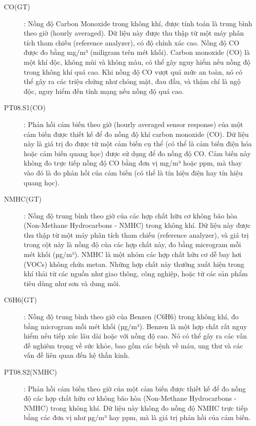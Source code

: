 \begin{description}
    \item[CO(GT)]: Nồng độ Carbon Monoxide trong không khí, được tính toán là trung bình theo giờ (hourly averaged). Dữ liệu này được thu thập từ một máy phân tích tham chiếu (reference analyzer), có độ chính xác cao. Nồng độ CO được đo bằng mg/m³ (miligram trên mét khối). Carbon monoxide (CO) là một khí độc, không mùi và không màu, có thể gây nguy hiểm nếu nồng độ trong không khí quá cao. Khi nồng độ CO vượt quá mức an toàn, nó có thể gây ra các triệu chứng như chóng mặt, đau đầu, và thậm chí là ngộ độc, nguy hiểm đến tính mạng nếu nồng độ quá cao.

    \item[PT08.S1(CO)]: Phản hồi cảm biến theo giờ (hourly averaged sensor response) của một cảm biến được thiết kế để đo nồng độ khí carbon monoxide (CO). Dữ liệu này là giá trị đo được từ một cảm biến cụ thể (có thể là cảm biến điện hóa hoặc cảm biến quang học) được sử dụng để đo nồng độ CO. Cảm biến này không đo trực tiếp nồng độ CO bằng đơn vị mg/m³ hoặc ppm, mà thay vào đó là đo phản hồi của cảm biến (có thể là tín hiệu điện hay tín hiệu quang học).

    \item[NMHC(GT)]: Nồng độ trung bình theo giờ của các hợp chất hữu cơ không bão hòa (Non-Methane Hydrocarbons - NMHC) trong không khí. Dữ liệu này được thu thập từ một máy phân tích tham chiếu (reference analyzer), và giá trị trong cột này là nồng độ của các hợp chất này, đo bằng microgram mỗi mét khối (µg/m³). NMHC là một nhóm các hợp chất hữu cơ dễ bay hơi (VOCs) không chứa metan. Những hợp chất này thường xuất hiện trong khí thải từ các nguồn như giao thông, công nghiệp, hoặc từ các sản phẩm tiêu dùng như sơn và dung môi.

    \item[C6H6(GT)]: Nồng độ trung bình theo giờ của Benzen (C6H6) trong không khí, đo bằng microgram mỗi mét khối (µg/m³). Benzen là một hợp chất rất nguy hiểm nếu tiếp xúc lâu dài hoặc với nồng độ cao. Nó có thể gây ra các vấn đề nghiêm trọng về sức khỏe, bao gồm các bệnh về máu, ung thư và các vấn đề liên quan đến hệ thần kinh.

    \item[PT08.S2(NMHC)]: Phản hồi cảm biến theo giờ của một cảm biến được thiết kế để đo nồng độ các hợp chất hữu cơ không bão hòa (Non-Methane Hydrocarbons - NMHC) trong không khí. Dữ liệu này không đo nồng độ NMHC trực tiếp bằng các đơn vị như µg/m³ hay ppm, mà là giá trị phản hồi của cảm biến.


\end{description}
